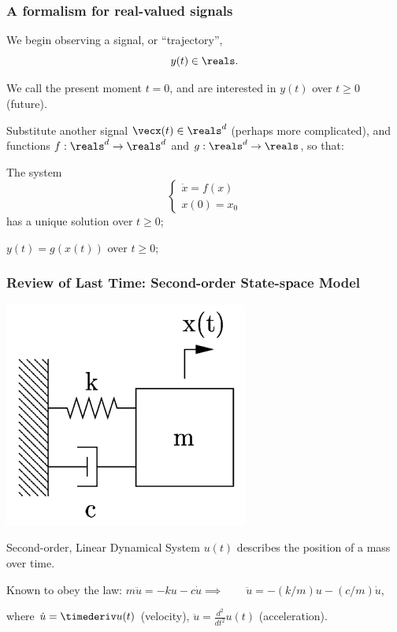 \documentclass[12pt]{beamer}
\begin{document}
\begin{frame}
\frametitle{A formalism for real-valued signals}

\begin{itemize}
\vitem We begin observing a signal, or ``trajectory'',
\[
y(t) \in \reals.
\]

\vitem We call the present moment $t=0$, and are interested in $y(t)$ over $t \geq 0$ (future).


\vitem Substitute another signal $\vecx(t) \in \reals^d$ (perhaps more complicated), and functions $f : \reals^d \to \reals^d$ and $g : \reals^d \to \reals$, so that:

\begin{enumerate}
\vitem The system
\[
\begin{cases}
	\dot x = f(x) \\
	x(0) = x_0
\end{cases}
\]
has a unique solution over $t \geq 0$;

\vitem $y(t) = g( x(t) )$ over $t \geq 0$;


\end{enumerate}

\end{itemize}

\vfill\null
\end{frame}






\begin{frame}
\frametitle{Review of Last Time: Second-order State-space Model}

\begin{center}
\includegraphics[width=.3\linewidth]{pic/spring-mass-damper.png}
\end{center}

\begin{block}{Second-order, Linear Dynamical System}
$u(t)$ describes the position of a mass over time.

Known to obey the law:
$m \ddot u = -k u - c \dot u
	\implies\qquad
	\ddot u = -(k/m) u - (c/m) \dot u$,
	
where $\dot u = \timederiv u(t)$ (velocity), $\ddot u = \frac{d^2}{dt^2} u(t)$ (acceleration).
\end{block}

\end{frame}
\end{document}
